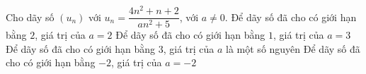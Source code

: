 \begin{ex}%
	Cho dãy số $(u_n)$ với $u_n=\dfrac{4n^2+n+2}{a n^2+5}$, với $a\ne  0$.
	 \choiceTF
		{\True  Để dãy số đã cho có giới hạn bằng $2$, giá trị của $a=2$}
		{Để dãy số đã cho có giới hạn bằng  $1$, giá trị của $a=3$}
		{Để dãy số  đã cho có giới hạn bằng $3$, giá trị của $a$ là một số nguyên}
		{\True Để dãy số đã cho  có giới hạn bằng $-2$, giá trị của $a=-2$}
\end{ex}

